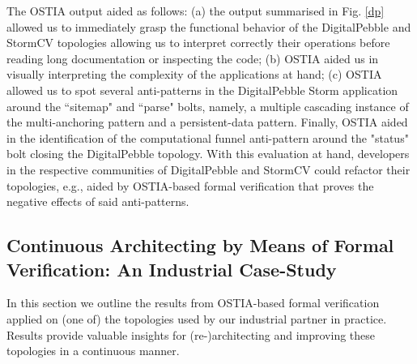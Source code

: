 The OSTIA output aided as follows: (a) the output summarised in Fig. \ref{dp}
allowed us to immediately grasp the functional behavior of the DigitalPebble and
StormCV topologies allowing us to interpret correctly their operations before
reading long documentation or inspecting the code; (b) OSTIA aided us in visually interpreting the complexity of the applications at hand; (c) OSTIA allowed us to spot several anti-patterns in the DigitalPebble Storm application around the ``sitemap" and ``parse" bolts, namely, a multiple cascading instance of the multi-anchoring pattern and a persistent-data pattern. Finally, OSTIA aided in the identification of the computational funnel anti-pattern around the "status" bolt closing the DigitalPebble topology. With this evaluation at hand, developers in the respective communities of DigitalPebble and StormCV could refactor their topologies, e.g., aided by OSTIA-based formal verification that proves the negative effects of said anti-patterns.
%
%

\subsection{Continuous Architecting by Means of Formal Verification: An Industrial Case-Study}

In this section we outline the results from OSTIA-based formal verification applied on (one of) the topologies used by our industrial partner in practice. Results provide valuable insights for (re-)architecting and improving these topologies in a continuous manner.

